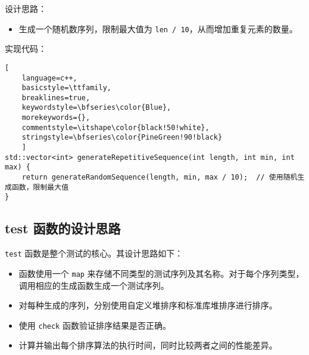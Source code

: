 \documentclass[UTF8]{ctexart}
\begin{document}
设计思路：
\begin{itemize}
    \item 生成一个随机数序列，限制最大值为 \texttt{len / 10}，从而增加重复元素的数量。
\end{itemize}

实现代码：
\begin{lstlisting}[ 
    language=c++,
    basicstyle=\ttfamily,
    breaklines=true,
    keywordstyle=\bfseries\color{Blue}, 
    morekeywords={}, 
    commentstyle=\itshape\color{black!50!white},
    stringstyle=\bfseries\color{PineGreen!90!black} 
    ]
std::vector<int> generateRepetitiveSequence(int length, int min, int max) {
    return generateRandomSequence(length, min, max / 10);  // 使用随机生成函数，限制最大值
}
\end{lstlisting}


\subsection{test 函数的设计思路}
\texttt{test} 函数是整个测试的核心。其设计思路如下：

\begin{itemize}
    \item 函数使用一个 \texttt{map} 来存储不同类型的测试序列及其名称。对于每个序列类型，调用相应的生成函数生成一个测试序列。
    \item 对每种生成的序列，分别使用自定义堆排序和标准库堆排序进行排序。
    \item 使用 \texttt{check} 函数验证排序结果是否正确。
    \item 计算并输出每个排序算法的执行时间，同时比较两者之间的性能差异。
\end{itemize}
\end{document}
